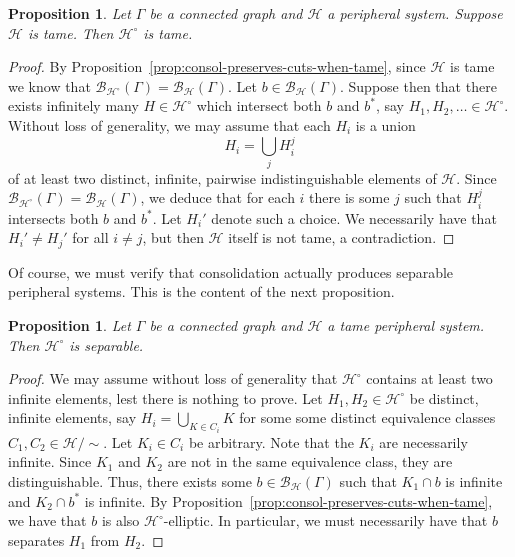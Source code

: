 \documentclass[11pt,a4paper]{amsart}
\newtheorem{proposition}[theorem]{Proposition}
\theoremstyle{definition}
\newcommand{\per}{\mathcal{H}}
\newcommand{\br}{{\mathscr{B}}}
\begin{document}
\begin{proposition}\label{prop:tameness-preserved}
    Let $\Gamma$ be a connected graph and $\per$ a peripheral system. Suppose $\per$ is tame. Then $\per^\circ$ is tame. 
\end{proposition}

\begin{proof}
    By Proposition~\ref{prop:consol-preserves-cuts-when-tame}, since $\per$ is tame we know that 
    $
    \br_{\per^\circ}(\Gamma) = \br_{\per}(\Gamma)
    $. 
    Let $b \in \br_\per(\Gamma)$. 
    Suppose then that there exists infinitely many $H \in \per^\circ$ which intersect both $b$ and $b^\ast$, say $H_1, H_2, \ldots \in \per^\circ$. Without loss of generality, we may assume that each $H_i$ is a union
    $$
    H_i = \bigcup_j H_i^j
    $$
    of at least two distinct, infinite, pairwise indistinguishable elements of $\per$. Since $\br_{\per^\circ}(\Gamma) = \br_{\per}(\Gamma)$, we deduce that for each $i$ there is some $j$ such that $H_i^j$ intersects both $b$ and $b^\ast$. Let $H_i'$ denote such a choice. We necessarily have that $H_i ' \neq H_j'$ for all $i \neq j$, but then $\per$ itself is not tame, a contradiction.
\end{proof}

Of course, we must verify that consolidation actually produces separable peripheral systems. This is the content of the next proposition. 

\begin{proposition}\label{prop:actually-seperable}
    Let $\Gamma$ be a connected graph and $\per$ a tame peripheral system. Then $\per^\circ$ is separable.
\end{proposition}

\begin{proof}
    We may assume without loss of generality that $\per^\circ$ contains at least two infinite elements, lest there is nothing to prove.
    Let $H_1, H_2 \in \per^\circ$ be distinct, infinite elements, say
    $
    H_i = \bigcup_{K \in C_i} K
    $
    for some some distinct equivalence classes $C_1, C_2 \in \per/\sim$. Let $K_i \in C_i$ be arbitrary. Note that the $K_i$ are necessarily infinite. Since $K_1$ and $K_2$ are not in the same equivalence class, they are distinguishable. Thus, there exists some $b \in \br_\per(\Gamma)$ such that $K_1 \cap b$ is infinite and $K_2 \cap b^\ast$ is infinite. By Proposition~\ref{prop:consol-preserves-cuts-when-tame}, we have that $b$ is also $\per^\circ$-elliptic. In particular, we must necessarily have that $b$ separates $H_1$ from $H_2$. 
\end{proof}
\end{document}
